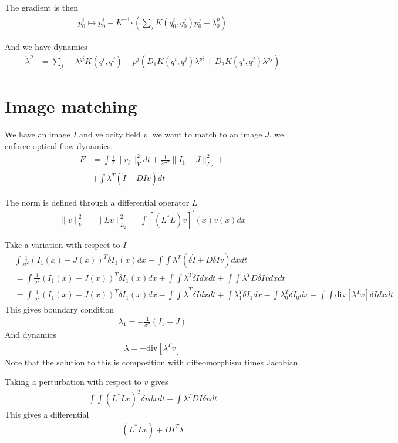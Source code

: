 \documentclass{article}
\begin{document}
The gradient is then
\begin{align*}
p_0^i \mapsto p_0^i - K^{-1}\epsilon (\sum_j K(q_0^i,q_0^j)p_0^j - \lambda^p_0)
\end{align*}

And we have dynamics
\begin{align*}
\dot \lambda^p &= \sum_j -\lambda^{qi}K(q^i,q^j) - p^j (D_1 K(q^i,q^j)\lambda^{pi} + D_2K(q^i,q^j)\lambda^{pj})
\end{align*}

\section{Image matching}
We have an image $I$ and velocity field $v$.  we want to match to an image $J$.  we enforce optical flow dynamics.
\begin{align*}
E &= \int \frac12 \|v_t\|^2_V dt + \frac{1}{2\sigma^2}\|I_1-J\|^2_{L_2} + \\
&+ \int \lambda^T(\dot I + DI v)dt
\end{align*}  

The norm is defined through a differential operator $L$
\begin{align*}
\|v\|^2_V = \|L v\|^2_{L_2} = \int [(L^*L)v]^t(x) v(x) dx
\end{align*}

Take a variation with respect to $I$
\begin{align*}
&\int \frac{1}{\sigma^2}(I_1(x) - J(x))^T\delta I_1(x)dx + \int \int \lambda^T (\delta \dot I + D\delta I v) dx dt\\
&=\int\frac{1}{\sigma^2}(I_1(x) - J(x))^T\delta I_1(x)dx + \int \int \lambda^T \delta \dot I dx dt + \int  \int \lambda^T D\delta I v dx dt\\
&= \int \frac{1}{\sigma^2}(I_1(x) - J(x))^T\delta I_1(x)dx - \int \int \dot \lambda^T \delta  I dx dt + \int \lambda^T_1 \delta I_1 dx - \int \lambda^T_0 \delta I_0 dx  - \int\int  \text{div} [\lambda^T v]   \delta I dx dt
\end{align*}
This gives boundary condition
\begin{align*}
\lambda_1 = -\frac{1}{\sigma^2}(I_1 - J)
\end{align*}
And dynamics
\begin{align*}
\dot \lambda = -\text{div}[\lambda^T v]
\end{align*}
Note that the solution to this is composition with diffeomorphism times Jacobian.

Taking a perturbation with respect to $v$ gives
\begin{align*}
\int \int (L^*L v)^T\delta v dx dt + \int  \lambda^T DI \delta vdt
\end{align*}
This gives a differential
\begin{align*}
(L^*L v) +  DI^T \lambda 
\end{align*}
\end{document}
